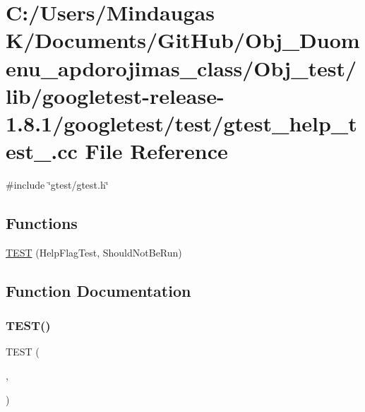 \hypertarget{_obj__test_2lib_2googletest-release-1_88_81_2googletest_2test_2gtest__help__test___8cc}{}\section{C\+:/\+Users/\+Mindaugas K/\+Documents/\+Git\+Hub/\+Obj\+\_\+\+Duomenu\+\_\+apdorojimas\+\_\+class/\+Obj\+\_\+test/lib/googletest-\/release-\/1.8.1/googletest/test/gtest\+\_\+help\+\_\+test\+\_\+.cc File Reference}
\label{_obj__test_2lib_2googletest-release-1_88_81_2googletest_2test_2gtest__help__test___8cc}
{\ttfamily \#include \char`\"{}gtest/gtest.\+h\char`\"{}}\newline
\subsection*{Functions}
\begin{DoxyCompactItemize}
\item 
\mbox{\hyperlink{_obj__test_2lib_2googletest-release-1_88_81_2googletest_2test_2gtest__help__test___8cc_add505cb10a4fda179911b3f349ff9696}{T\+E\+ST}} (Help\+Flag\+Test, Should\+Not\+Be\+Run)
\end{DoxyCompactItemize}


\subsection{Function Documentation}
\mbox{\label{_obj__test_2lib_2googletest-release-1_88_81_2googletest_2test_2gtest__help__test___8cc_add505cb10a4fda179911b3f349ff9696}} 
\subsubsection{\texorpdfstring{TEST()}{TEST()}}
{\footnotesize\ttfamily T\+E\+ST (\begin{DoxyParamCaption}\item[{Help\+Flag\+Test}]{,  }\item[{Should\+Not\+Be\+Run}]{ }\end{DoxyParamCaption})}

